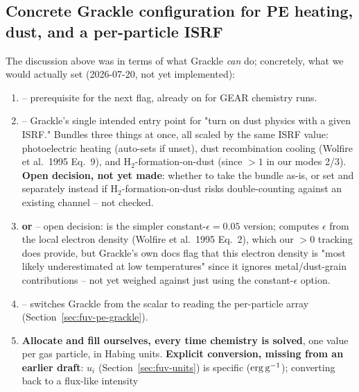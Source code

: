 \subsection{Concrete Grackle configuration for PE heating, dust, and a
per-particle ISRF}
\label{sec:fuv-pe-concrete}

The discussion above was in terms of what Grackle \emph{can} do;
concretely, what we would actually set (2026-07-20, not yet
implemented):

\begin{enumerate}
  \item {} -- prerequisite for the next flag,
    already on for GEAR chemistry runs.
  \item {} -- Grackle's single intended entry
    point for "turn on dust physics with a given ISRF." Bundles three
    things at once, all scaled by the same ISRF value: photoelectric
    heating (auto-sets  if unset), dust
    recombination cooling (Wolfire et al.\ 1995 Eq.~9), and
    H$_2$-formation-on-dust (since $>1$ in
    our modes 2/3). \textbf{Open decision, not yet made}: whether to
    take the bundle as-is, or set  and
     separately instead if
    H$_2$-formation-on-dust risks double-counting against an existing
    channel -- not checked.
  \item {} \textbf{or}  -- open
    decision:  is the simpler constant-$\epsilon=0.05$
    version;  computes $\epsilon$ from the local electron
    density (Wolfire et al.\ 1995 Eq.~2), which our
    $>0$ tracking does provide, but
    Grackle's own docs flag that this electron density is
    "most likely underestimated at low temperatures" since it ignores
    metal/dust-grain contributions -- not yet weighed against just
    using the constant-$\epsilon$ option.
  \item {} -- switches Grackle from the scalar
     to reading the per-particle
     array (Section~\ref{sec:fuv-pe-grackle}).
  \item \textbf{Allocate and fill  ourselves,
    every time chemistry is solved}, one value per gas particle, in
    Habing units. \textbf{Explicit conversion, missing from an earlier
    draft}: $u_i$ (Section~\ref{sec:fuv-units}) is specific
    (${\rm erg\,g^{-1}}$); converting back to a flux-like intensity

\end{enumerate}
